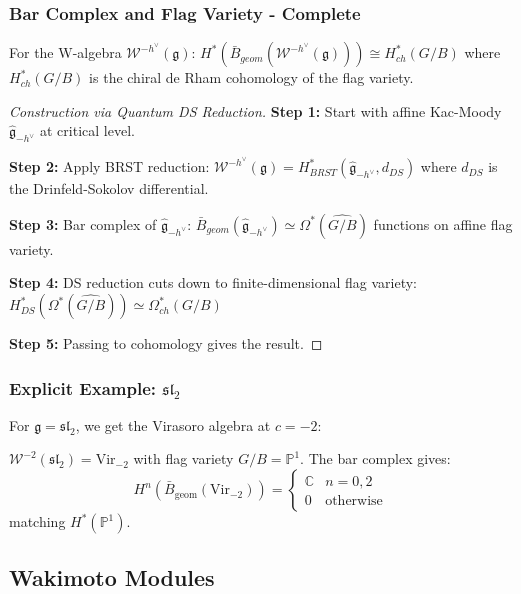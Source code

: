 \subsubsection{Bar Complex and Flag Variety - Complete}

\begin{theorem}
For the W-algebra $\mathcal{W}^{-h^\vee}(\mathfrak{g})$:
$H^*(\bar{B}_{geom}(\mathcal{W}^{-h^\vee}(\mathfrak{g}))) \cong H^*_{ch}(G/B)$
where $H^*_{ch}(G/B)$ is the chiral de Rham cohomology of the flag variety.
\end{theorem}

\begin{proof}[Construction via Quantum DS Reduction]
\textbf{Step 1:} Start with affine Kac-Moody $\hat{\mathfrak{g}}_{-h^\vee}$ at critical level.

\textbf{Step 2:} Apply BRST reduction:
$\mathcal{W}^{-h^\vee}(\mathfrak{g}) = H^*_{BRST}(\hat{\mathfrak{g}}_{-h^\vee}, d_{DS})$
where $d_{DS}$ is the Drinfeld-Sokolov differential.

\textbf{Step 3:} Bar complex of $\hat{\mathfrak{g}}_{-h^\vee}$:
$\bar{B}_{geom}(\hat{\mathfrak{g}}_{-h^\vee}) \simeq \Omega^*(\widehat{G/B})$
functions on affine flag variety.

\textbf{Step 4:} DS reduction cuts down to finite-dimensional flag variety:
$H^*_{DS}(\Omega^*(\widehat{G/B})) \simeq \Omega^*_{ch}(G/B)$

\textbf{Step 5:} Passing to cohomology gives the result.
\end{proof}
 
\subsubsection{Explicit Example: $\mathfrak{sl}_2$}
 
For $\mathfrak{g} = \mathfrak{sl}_2$, we get the Virasoro algebra at $c = -2$:
 
\begin{proposition}
$\mathcal{W}^{-2}(\mathfrak{sl}_2) = \text{Vir}_{-2}$ with flag variety $G/B = \mathbb{P}^1$. The bar complex gives:
\[
H^n(\bar{B}_{\text{geom}}(\text{Vir}_{-2})) = 
\begin{cases}
\mathbb{C} & n = 0, 2 \\
0 & \text{otherwise}
\end{cases}
\]
matching $H^*(\mathbb{P}^1)$.
\end{proposition}
 
\subsection{Wakimoto Modules}
 
